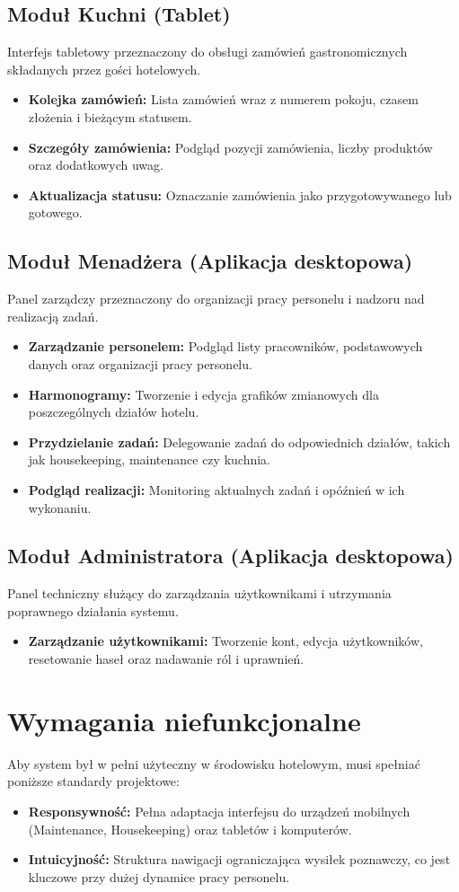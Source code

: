\subsection{Moduł Kuchni (Tablet)}
Interfejs tabletowy przeznaczony do obsługi zamówień gastronomicznych składanych przez gości hotelowych.
\begin{itemize}
    \item \textbf{Kolejka zamówień:} Lista zamówień wraz z numerem pokoju, czasem złożenia i bieżącym statusem.
    \item \textbf{Szczegóły zamówienia:} Podgląd pozycji zamówienia, liczby produktów oraz dodatkowych uwag.
    \item \textbf{Aktualizacja statusu:} Oznaczanie zamówienia jako przygotowywanego lub gotowego.
\end{itemize}

\subsection{Moduł Menadżera (Aplikacja desktopowa)}
Panel zarządczy przeznaczony do organizacji pracy personelu i nadzoru nad realizacją zadań.
\begin{itemize}
    \item \textbf{Zarządzanie personelem:} Podgląd listy pracowników, podstawowych danych oraz organizacji pracy personelu.
    \item \textbf{Harmonogramy:} Tworzenie i edycja grafików zmianowych dla poszczególnych działów hotelu.
    \item \textbf{Przydzielanie zadań:} Delegowanie zadań do odpowiednich działów, takich jak housekeeping, maintenance czy kuchnia.
    \item \textbf{Podgląd realizacji:} Monitoring aktualnych zadań i opóźnień w ich wykonaniu.
\end{itemize}

\subsection{Moduł Administratora (Aplikacja desktopowa)}
Panel techniczny służący do zarządzania użytkownikami i utrzymania poprawnego działania systemu.
\begin{itemize}
    \item \textbf{Zarządzanie użytkownikami:} Tworzenie kont, edycja użytkowników, resetowanie haseł oraz nadawanie ról i uprawnień.
\end{itemize}

\section{Wymagania niefunkcjonalne}
Aby system był w pełni użyteczny w środowisku hotelowym, musi spełniać poniższe standardy projektowe:
\begin{itemize}
    \item \textbf{Responsywność:} Pełna adaptacja interfejsu do urządzeń mobilnych (Maintenance, Housekeeping) oraz tabletów i komputerów.
    \item \textbf{Intuicyjność:} Struktura nawigacji ograniczająca wysiłek poznawczy, co jest kluczowe przy dużej dynamice pracy personelu.
\end{itemize}